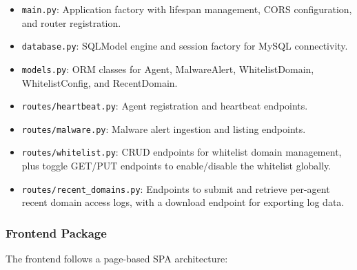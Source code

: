 \documentclass[../Main.tex]{subfiles}
\begin{document}
\begin{itemize}
    \item \texttt{main.py}: Application factory with lifespan management, CORS configuration, and router registration.
    \item \texttt{database.py}: SQLModel engine and session factory for MySQL connectivity.
    \item \texttt{models.py}: ORM classes for Agent, MalwareAlert, WhitelistDomain, WhitelistConfig, and RecentDomain.
    \item \texttt{routes/heartbeat.py}: Agent registration and heartbeat endpoints.
    \item \texttt{routes/malware.py}: Malware alert ingestion and listing endpoints.
    \item \texttt{routes/whitelist.py}: CRUD endpoints for whitelist domain management, plus toggle GET/PUT endpoints to enable/disable the whitelist globally.
    \item \texttt{routes/recent\_domains.py}: Endpoints to submit and retrieve per-agent recent domain access logs, with a download endpoint for exporting log data.
\end{itemize}

\subsubsection{Frontend Package}

The frontend follows a page-based SPA architecture:
\end{document}
